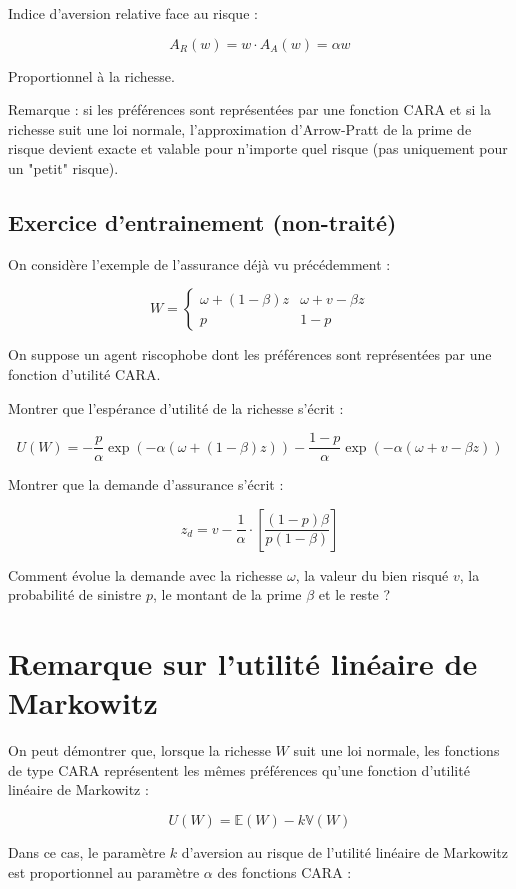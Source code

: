 \documentclass[a4paper, 12pt]{report}
\begin{document}
Indice d'aversion relative face au risque :

\[
A_R(w) = w \cdot A_A(w) = \alpha w
\]

Proportionnel à la richesse.

Remarque : si les préférences sont représentées par une fonction CARA et si la richesse suit une loi normale, l'approximation d'Arrow-Pratt de la prime de risque devient exacte et valable pour n'importe quel risque (pas uniquement pour un "petit" risque).

\subsection{Exercice d'entrainement (non-traité)}

On considère l'exemple de l'assurance déjà vu précédemment :

\[
W = 
\begin{cases}
	\omega + (1 - \beta)z & \omega + v - \beta z   \\
	p &  1 - p
\end{cases}
\]

On suppose un agent riscophobe dont les préférences sont représentées par une fonction d'utilité CARA.

Montrer que l'espérance d'utilité de la richesse s'écrit :

\[
U(W) = -\frac{p}{\alpha} \exp(-\alpha (\omega + (1 - \beta)z)) - \frac{1 - p}{\alpha} \exp(-\alpha(\omega + v - \beta z))
\]

Montrer que la demande d'assurance s'écrit :

\[
z_d = v- \frac{ 1}{\alpha} \cdot \left[ \frac{(1-p)\beta}{p(1 - \beta)}\right] 
\]

Comment évolue la demande avec la richesse \( \omega \), la valeur du bien risqué \( v \), la probabilité de sinistre \( p \), le montant de la prime \( \beta \) et le reste ?

\section{Remarque sur l'utilité linéaire de Markowitz}

On peut démontrer que, lorsque la richesse \( W \) suit une loi normale, les fonctions de type CARA représentent les mêmes préférences qu'une fonction d'utilité linéaire de Markowitz :

\[
U(W) = \mathbb{E}(W) - k\mathbb{V}(W)
\]

Dans ce cas, le paramètre \( k \) d'aversion au risque de l'utilité linéaire de Markowitz est proportionnel au paramètre \( \alpha \) des fonctions CARA :
\end{document}
